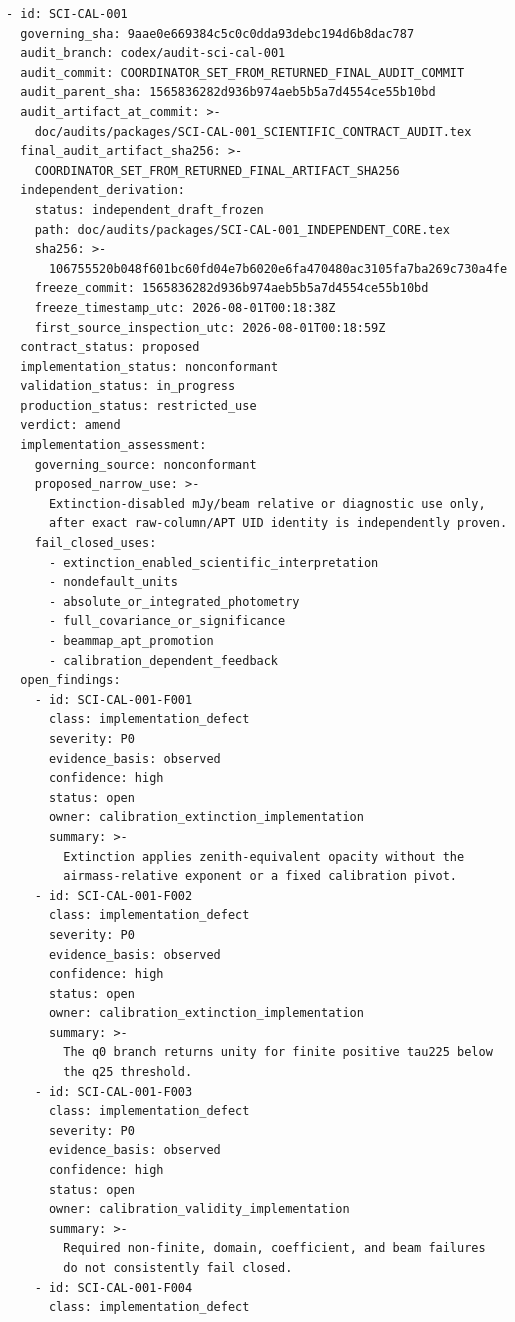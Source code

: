 \documentclass[11pt]{article}
\begin{document}
\begin{small}
\begin{verbatim}
- id: SCI-CAL-001
  governing_sha: 9aae0e669384c5c0c0dda93debc194d6b8dac787
  audit_branch: codex/audit-sci-cal-001
  audit_commit: COORDINATOR_SET_FROM_RETURNED_FINAL_AUDIT_COMMIT
  audit_parent_sha: 1565836282d936b974aeb5b5a7d4554ce55b10bd
  audit_artifact_at_commit: >-
    doc/audits/packages/SCI-CAL-001_SCIENTIFIC_CONTRACT_AUDIT.tex
  final_audit_artifact_sha256: >-
    COORDINATOR_SET_FROM_RETURNED_FINAL_ARTIFACT_SHA256
  independent_derivation:
    status: independent_draft_frozen
    path: doc/audits/packages/SCI-CAL-001_INDEPENDENT_CORE.tex
    sha256: >-
      106755520b048f601bc60fd04e7b6020e6fa470480ac3105fa7ba269c730a4fe
    freeze_commit: 1565836282d936b974aeb5b5a7d4554ce55b10bd
    freeze_timestamp_utc: 2026-08-01T00:18:38Z
    first_source_inspection_utc: 2026-08-01T00:18:59Z
  contract_status: proposed
  implementation_status: nonconformant
  validation_status: in_progress
  production_status: restricted_use
  verdict: amend
  implementation_assessment:
    governing_source: nonconformant
    proposed_narrow_use: >-
      Extinction-disabled mJy/beam relative or diagnostic use only,
      after exact raw-column/APT UID identity is independently proven.
    fail_closed_uses:
      - extinction_enabled_scientific_interpretation
      - nondefault_units
      - absolute_or_integrated_photometry
      - full_covariance_or_significance
      - beammap_apt_promotion
      - calibration_dependent_feedback
  open_findings:
    - id: SCI-CAL-001-F001
      class: implementation_defect
      severity: P0
      evidence_basis: observed
      confidence: high
      status: open
      owner: calibration_extinction_implementation
      summary: >-
        Extinction applies zenith-equivalent opacity without the
        airmass-relative exponent or a fixed calibration pivot.
    - id: SCI-CAL-001-F002
      class: implementation_defect
      severity: P0
      evidence_basis: observed
      confidence: high
      status: open
      owner: calibration_extinction_implementation
      summary: >-
        The q0 branch returns unity for finite positive tau225 below
        the q25 threshold.
    - id: SCI-CAL-001-F003
      class: implementation_defect
      severity: P0
      evidence_basis: observed
      confidence: high
      status: open
      owner: calibration_validity_implementation
      summary: >-
        Required non-finite, domain, coefficient, and beam failures
        do not consistently fail closed.
    - id: SCI-CAL-001-F004
      class: implementation_defect

\end{verbatim}
\end{small}
\end{document}
